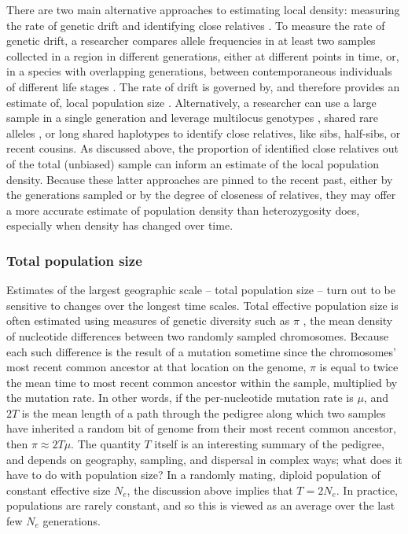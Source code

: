 \documentclass{ar-1col}
\begin{document}
There are two main alternative approaches to estimating local density: 
measuring the rate of genetic drift  and identifying close relatives \citep{Wang2016Prediction}.
To measure the rate of genetic drift, 
a researcher compares allele frequencies
in at least two samples collected in a region in different generations, 
either at different points in time,
or, in a species with overlapping generations, 
between contemporaneous individuals of different life stages
\citep{WilliamsonSlatkin1999}.
The rate of drift is governed by, 
and therefore provides an estimate of, 
local population size
\citep{ewens2004mpg,Charlesworth2009}.
Alternatively, a researcher can use a large sample in a single generation 
and leverage multilocus genotypes \citep{nomura2008estimation,WaplesWaples2011,Wang_2014},
shared rare alleles \citep{NovembreSlatkin2009}, 
or long shared haplotypes \citep[e.g.,][]{ralph2013geography}
to identify close relatives, like sibs, half-sibs, or recent cousins.
As discussed above, the proportion of identified close relatives out of the total (unbiased)
sample can inform an estimate of the local population density.
Because these latter approaches are pinned to the recent past, 
either by the generations sampled or by the degree of closeness of relatives,
they may offer a more accurate estimate of population density than heterozygosity does, 
especially when density has changed over time.

\subsubsection{Total population size}

Estimates of the largest geographic scale -- total population size --
turn out to be sensitive to changes over the longest time scales.
Total effective population size is often estimated using measures of genetic diversity such as $\pi$ \citep{NeiLi1979,Tajima89},
the mean density of nucleotide differences between two randomly sampled chromosomes.
Because each such difference is the result of a mutation
sometime since the chromosomes' most recent common ancestor at that location on the genome,
$\pi$ is equal to twice the mean time to most recent common ancestor
within the sample, multiplied by the mutation rate.
In other words, if the per-nucleotide mutation rate is $\mu$,
and $2T$ is the mean length of a path through the pedigree
along which two samples have inherited a random bit of genome
from their most recent common ancestor,
then $\pi \approx 2 T \mu$.
The quantity $T$ itself is an interesting summary of the pedigree,
and depends on geography, sampling, and dispersal in complex ways;
what does it have to do with population size?
In a randomly mating, diploid population of constant effective size $N_e$,
the discussion above implies that $T = 2N_e$.
In practice, populations are rarely constant, and so this is viewed as an average
over the last few $N_e$ generations.
\end{document}
